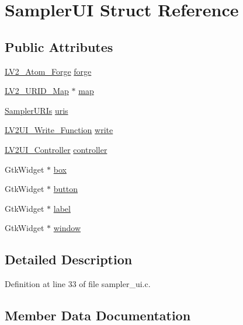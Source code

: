 \hypertarget{struct_sampler_u_i}{}\section{Sampler\+UI Struct Reference}
\label{struct_sampler_u_i}
\subsection*{Public Attributes}
\begin{DoxyCompactItemize}
\item 
\hyperlink{struct_l_v2___atom___forge}{L\+V2\+\_\+\+Atom\+\_\+\+Forge} \hyperlink{struct_sampler_u_i_a70537477cd7f3d568ea0df161138e7e0}{forge}
\item 
\hyperlink{urid_8h_afefb42cd271f750506a8739f73c098c5}{L\+V2\+\_\+\+U\+R\+I\+D\+\_\+\+Map} $\ast$ \hyperlink{struct_sampler_u_i_ab70cd8f6772ae2a6127b66d1b0aeb7e4}{map}
\item 
\hyperlink{struct_sampler_u_r_is}{Sampler\+U\+R\+Is} \hyperlink{struct_sampler_u_i_a6b8842578d50959dfeebae4fabd1f411}{uris}
\item 
\hyperlink{ui_8h_a62502987d06bc97ea88521aacc0990c9}{L\+V2\+U\+I\+\_\+\+Write\+\_\+\+Function} \hyperlink{struct_sampler_u_i_af1e10fbeff622855a17bc40e09c99674}{write}
\item 
\hyperlink{ui_8h_a055fb969db1ceb4a345b6548a03c5876}{L\+V2\+U\+I\+\_\+\+Controller} \hyperlink{struct_sampler_u_i_af020d8961fb4a38099d38d42eadd1a9c}{controller}
\item 
Gtk\+Widget $\ast$ \hyperlink{struct_sampler_u_i_ad2d708c40329570e1a20136257bec213}{box}
\item 
Gtk\+Widget $\ast$ \hyperlink{struct_sampler_u_i_a883cc0ffab4c838befebc788b6cfd5ba}{button}
\item 
Gtk\+Widget $\ast$ \hyperlink{struct_sampler_u_i_a25af054ff8222653e4527f88007861b1}{label}
\item 
Gtk\+Widget $\ast$ \hyperlink{struct_sampler_u_i_aaa0ff0f59c4d8c45afe44c1936a3378e}{window}
\end{DoxyCompactItemize}


\subsection{Detailed Description}


Definition at line 33 of file sampler\+\_\+ui.\+c.



\subsection{Member Data Documentation}
